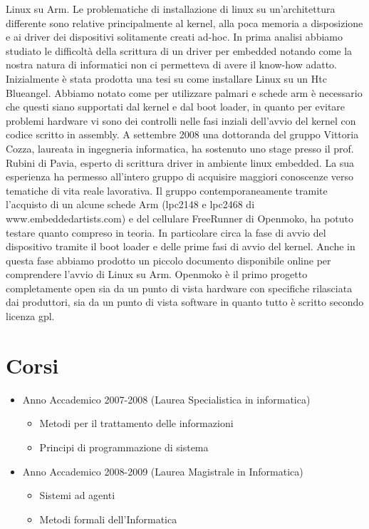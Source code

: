 \documentclass[a4paper,12pt]{article}
\renewcommand{\aa }{\`{a} }
\newcommand{\ea }{\`{e} }
\begin{document}
Linux su Arm.
Le problematiche di installazione di linux su un'architettura differente sono relative principalmente al kernel, alla poca memoria a disposizione e ai driver dei dispositivi solitamente creati ad-hoc. In prima analisi abbiamo studiato le difficolt\aa della scrittura di un driver per embedded notando come la nostra natura di informatici non ci permetteva di avere il know-how adatto.
Inizialmente \ea stata prodotta una tesi su come installare Linux su un Htc Blueangel. Abbiamo notato come per utilizzare palmari e schede arm \ea necessario che questi siano supportati dal kernel e dal boot loader, in quanto per evitare problemi hardware vi sono dei controlli nelle fasi inziali dell'avvio del kernel con codice scritto in assembly.
A settembre 2008 una dottoranda del gruppo Vittoria Cozza, laureata in ingegneria informatica, ha sostenuto uno stage presso il prof. Rubini di Pavia, esperto di scrittura driver in ambiente linux embedded. La sua esperienza ha permesso all'intero gruppo di acquisire maggiori conoscenze verso tematiche di vita reale lavorativa. Il gruppo contemporaneamente tramite l'acquisto di un alcune schede Arm (lpc2148 e lpc2468 di  www.embeddedartists.com) e del cellulare FreeRunner di Openmoko, ha potuto testare quanto compreso in teoria. In particolare circa la fase di avvio del dispositivo tramite il boot loader e delle prime fasi di avvio del kernel. Anche in questa fase abbiamo prodotto un piccolo documento disponibile online per comprendere l'avvio di Linux su Arm.
Openmoko \ea il primo progetto completamente open sia da un punto di vista hardware con specifiche rilasciata dai produttori, sia da un punto di vista software in quanto tutto \ea scritto secondo licenza gpl.

\section*{Corsi}
\begin{itemize}
\item Anno Accademico 2007-2008 (Laurea Specialistica in informatica)
\begin{itemize}
 \item Metodi per il trattamento delle informazioni
\item Principi di programmazione di sistema
\end{itemize}
\item Anno Accademico 2008-2009 (Laurea Magistrale in Informatica)
\begin{itemize}
\item Sistemi ad agenti
\item Metodi formali dell'Informatica
\end{itemize}

\end{itemize}
\end{document}
